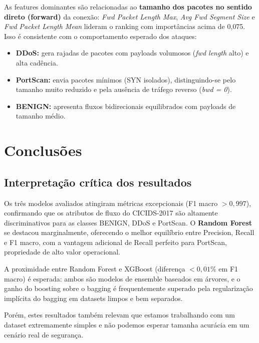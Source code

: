 \documentclass[12pt,a4paper]{article}
\begin{document}
As features dominantes são relacionadas ao \textbf{tamanho dos pacotes no
sentido direto (forward)} da conexão: \emph{Fwd Packet Length Max},
\emph{Avg Fwd Segment Size} e \emph{Fwd Packet Length Mean} lideram o ranking
com importâncias acima de 0{,}075. Isso é consistente com o comportamento
esperado dos ataques:

\begin{itemize}
  \item \textbf{DDoS:} gera rajadas de pacotes com payloads volumosos
        (\emph{fwd length} alto) e alta cadência.
  \item \textbf{PortScan:} envia pacotes mínimos (SYN isolados), distinguindo-se
        pelo tamanho muito reduzido e pela ausência de tráfego reverso
        (\emph{bwd = 0}).
  \item \textbf{BENIGN:} apresenta fluxos bidirecionais equilibrados com
        payloads de tamanho médio.
\end{itemize}

\section{Conclusões}
\label{sec:conclusoes}

\subsection{Interpretação crítica dos resultados}

Os três modelos avaliados atingiram métricas excepcionais (F1 macro $> 0{,}997$),
confirmando que os atributos de fluxo do CICIDS-2017 são altamente discriminativos
para as classes BENIGN, DDoS e PortScan. O \textbf{Random Forest} se destacou
marginalmente, oferecendo o melhor equilíbrio entre Precision, Recall e F1
macro, com a vantagem adicional de Recall perfeito para PortScan,
propriedade de alto valor operacional.

A proximidade entre Random Forest e XGBoost (diferença $< 0{,}01\%$ em F1
macro) é esperada: ambos são modelos de ensemble baseados em árvores, e o
ganho do boosting sobre o bagging é frequentemente superado pela regularização
implícita do bagging em datasets limpos e bem separados.

Porém, estes resultados também relevam que estamos trabalhando com um dataset extremamente simples e não podemos esperar tamanha acurácia em um cenário real de segurança.
\end{document}
